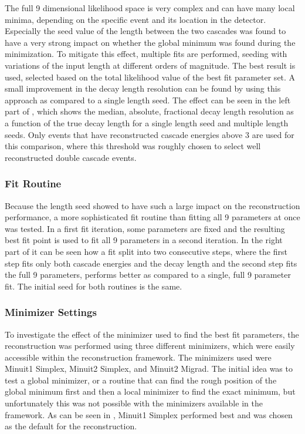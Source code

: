 The full 9 dimensional likelihood space is very complex and can have many local minima, depending on the specific event and its location in the detector. Especially the seed value of the length between the two cascades was found to have a very strong impact on whether the global minimum was found during the minimization. To mitigate this effect, multiple fits are performed, seeding with variations of the input length at different orders of magnitude. The best result is used, selected based on the total likelihood value of the best fit parameter set. A small improvement in the decay length resolution can be found by using this approach as compared to a single length seed. The effect can be seen in the left part of , which shows the median, absolute, fractional decay length resolution as a function of the true decay length for a single length seed and multiple length seeds. Only events that have reconstructed cascade energies above \SI{3}{\gev} are used for this comparison, where this threshold was roughly chosen to select well reconstructed double cascade events.


\subsubsection{Fit Routine}

Because the length seed showed to have such a large impact on the reconstruction performance, a more sophisticated fit routine than fitting all 9 parameters at once was tested. In a first fit iteration, some parameters are fixed and the resulting best fit point is used to fit all 9 parameters in a second iteration. In the right part of  it can be seen how a fit split into two consecutive steps, where the first step fits only both cascade energies and the decay length and the second step fits the full 9 parameters, performs better as compared to a single, full 9 parameter fit. The initial seed for both routines is the same.


\subsubsection{Minimizer Settings}

To investigate the effect of the minimizer used to find the best fit parameters, the reconstruction was performed using three different minimizers, which were easily accessible within the reconstruction framework. The minimizers used were Minuit1 Simplex, Minuit2 Simplex, and Minuit2 Migrad. The initial idea was to test a global minimizer, or a routine that can find the rough position of the global minimum first and then a local minimizer to find the exact minimum, but unfortunately this was not possible with the minimizers available in the framework. As can be seen in , Minuit1 Simplex performed best and was chosen as the default for the reconstruction.

